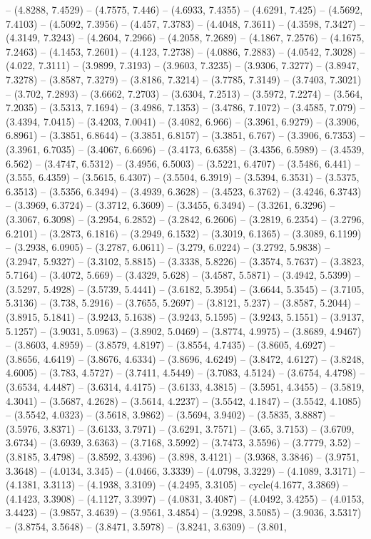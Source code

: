 -- (4.8288, 7.4529) -- (4.7575, 7.446) -- (4.6933, 7.4355) -- (4.6291, 7.425) -- (4.5692, 7.4103) -- (4.5092, 7.3956) -- (4.457, 7.3783) -- (4.4048, 7.3611) -- (4.3598, 7.3427) -- (4.3149, 7.3243) -- (4.2604, 7.2966) -- (4.2058, 7.2689) -- (4.1867, 7.2576) -- (4.1675, 7.2463) -- (4.1453, 7.2601) -- (4.123, 7.2738) -- (4.0886, 7.2883) -- (4.0542, 7.3028) -- (4.022, 7.3111) -- (3.9899, 7.3193) -- (3.9603, 7.3235) -- (3.9306, 7.3277) -- (3.8947, 7.3278) -- (3.8587, 7.3279) -- (3.8186, 7.3214) -- (3.7785, 7.3149) -- (3.7403, 7.3021) -- (3.702, 7.2893) -- (3.6662, 7.2703) -- (3.6304, 7.2513) -- (3.5972, 7.2274) -- (3.564, 7.2035) -- (3.5313, 7.1694) -- (3.4986, 7.1353) -- (3.4786, 7.1072) -- (3.4585, 7.079) -- (3.4394, 7.0415) -- (3.4203, 7.0041) -- (3.4082, 6.966) -- (3.3961, 6.9279) -- (3.3906, 6.8961) -- (3.3851, 6.8644) -- (3.3851, 6.8157) -- (3.3851, 6.767) -- (3.3906, 6.7353) -- (3.3961, 6.7035) -- (3.4067, 6.6696) -- (3.4173, 6.6358) -- (3.4356, 6.5989) -- (3.4539, 6.562) -- (3.4747, 6.5312) -- (3.4956, 6.5003) -- (3.5221, 6.4707) -- (3.5486, 6.441) -- (3.555, 6.4359) -- (3.5615, 6.4307) -- (3.5504, 6.3919) -- (3.5394, 6.3531) -- (3.5375, 6.3513) -- (3.5356, 6.3494) -- (3.4939, 6.3628) -- (3.4523, 6.3762) -- (3.4246, 6.3743) -- (3.3969, 6.3724) -- (3.3712, 6.3609) -- (3.3455, 6.3494) -- (3.3261, 6.3296) -- (3.3067, 6.3098) -- (3.2954, 6.2852) -- (3.2842, 6.2606) -- (3.2819, 6.2354) -- (3.2796, 6.2101) -- (3.2873, 6.1816) -- (3.2949, 6.1532) -- (3.3019, 6.1365) -- (3.3089, 6.1199) -- (3.2938, 6.0905) -- (3.2787, 6.0611) -- (3.279, 6.0224) -- (3.2792, 5.9838) -- (3.2947, 5.9327) -- (3.3102, 5.8815) -- (3.3338, 5.8226) -- (3.3574, 5.7637) -- (3.3823, 5.7164) -- (3.4072, 5.669) -- (3.4329, 5.628) -- (3.4587, 5.5871) -- (3.4942, 5.5399) -- (3.5297, 5.4928) -- (3.5739, 5.4441) -- (3.6182, 5.3954) -- (3.6644, 5.3545) -- (3.7105, 5.3136) -- (3.738, 5.2916) -- (3.7655, 5.2697) -- (3.8121, 5.237) -- (3.8587, 5.2044) -- (3.8915, 5.1841) -- (3.9243, 5.1638) -- (3.9243, 5.1595) -- (3.9243, 5.1551) -- (3.9137, 5.1257) -- (3.9031, 5.0963) -- (3.8902, 5.0469) -- (3.8774, 4.9975) -- (3.8689, 4.9467) -- (3.8603, 4.8959) -- (3.8579, 4.8197) -- (3.8554, 4.7435) -- (3.8605, 4.6927) -- (3.8656, 4.6419) -- (3.8676, 4.6334) -- (3.8696, 4.6249) -- (3.8472, 4.6127) -- (3.8248, 4.6005) -- (3.783, 4.5727) -- (3.7411, 4.5449) -- (3.7083, 4.5124) -- (3.6754, 4.4798) -- (3.6534, 4.4487) -- (3.6314, 4.4175) -- (3.6133, 4.3815) -- (3.5951, 4.3455) -- (3.5819, 4.3041) -- (3.5687, 4.2628) -- (3.5614, 4.2237) -- (3.5542, 4.1847) -- (3.5542, 4.1085) -- (3.5542, 4.0323) -- (3.5618, 3.9862) -- (3.5694, 3.9402) -- (3.5835, 3.8887) -- (3.5976, 3.8371) -- (3.6133, 3.7971) -- (3.6291, 3.7571) -- (3.65, 3.7153) -- (3.6709, 3.6734) -- (3.6939, 3.6363) -- (3.7168, 3.5992) -- (3.7473, 3.5596) -- (3.7779, 3.52) -- (3.8185, 3.4798) -- (3.8592, 3.4396) -- (3.898, 3.4121) -- (3.9368, 3.3846) -- (3.9751, 3.3648) -- (4.0134, 3.345) -- (4.0466, 3.3339) -- (4.0798, 3.3229) -- (4.1089, 3.3171) -- (4.1381, 3.3113) -- (4.1938, 3.3109) -- (4.2495, 3.3105) -- cycle(4.1677, 3.3869) -- (4.1423, 3.3908) -- (4.1127, 3.3997) -- (4.0831, 3.4087) -- (4.0492, 3.4255) -- (4.0153, 3.4423) -- (3.9857, 3.4639) -- (3.9561, 3.4854) -- (3.9298, 3.5085) -- (3.9036, 3.5317) -- (3.8754, 3.5648) -- (3.8471, 3.5978) -- (3.8241, 3.6309) -- (3.801, 